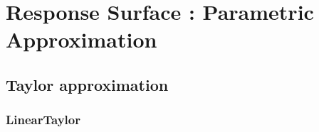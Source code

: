 

\newpage
{}
\section{Response Surface : Parametric Approximation}

\subsection{Taylor approximation}

\subsubsection{LinearTaylor}

